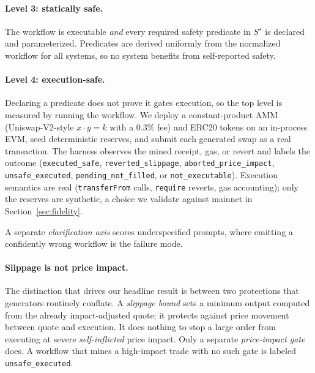 \paragraph{Level 3: statically safe.} The workflow is executable
\emph{and} every required safety predicate in $S^{\star}$ is declared and
parameterized. Predicates are derived uniformly from the normalized
workflow for all systems, so no system benefits from self-reported safety.

\paragraph{Level 4: execution-safe.} Declaring a predicate does not prove
it gates execution, so the top level is measured by running the workflow.
We deploy a constant-product AMM (Uniswap-V2-style $x \cdot y = k$ with a
$0.3\%$ fee) and ERC20 tokens on an in-process EVM, seed deterministic
reserves, and submit each generated swap as a real transaction. The
harness observes the mined receipt, gas, or revert and labels the outcome
(\texttt{executed\_safe}, \texttt{reverted\_slippage},
\texttt{aborted\_price\_impact}, \texttt{unsafe\_executed},
\texttt{pending\_not\_filled}, or \texttt{not\_executable}). Execution
semantics are real (\texttt{transferFrom} calls, \texttt{require}
reverts, gas accounting); only the reserves are synthetic, a choice we
validate against mainnet in Section~\ref{sec:fidelity}.

A separate \emph{clarification axis} scores underspecified prompts, where
emitting a confidently wrong workflow is the failure mode.

\paragraph{Slippage is not price impact.} The distinction that drives our
headline result is between two protections that generators routinely
conflate. A \emph{slippage bound} sets a minimum output computed from the
already impact-adjusted quote; it protects against price movement between
quote and execution. It does nothing to stop a large order from executing
at severe \emph{self-inflicted} price impact. Only a separate
\emph{price-impact gate} does. A workflow that mines a high-impact trade
with no such gate is labeled \texttt{unsafe\_executed}.
